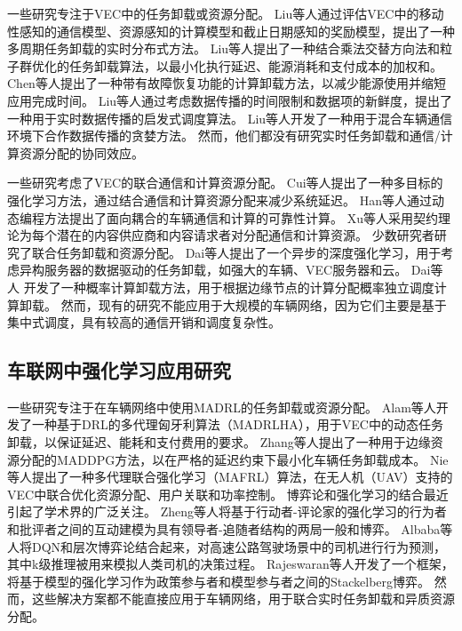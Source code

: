 一些研究专注于VEC中的任务卸载或资源分配。
Liu等人\cite{liu2021rtds}通过评估VEC中的移动性感知的通信模型、资源感知的计算模型和截止日期感知的奖励模型，提出了一种多周期任务卸载的实时分布式方法。
Liu等人\cite{liu2022a}提出了一种结合乘法交替方向法和粒子群优化的任务卸载算法，以最小化执行延迟、能源消耗和支付成本的加权和。
Chen等人\cite{chen2020robust}提出了一种带有故障恢复功能的计算卸载方法，以减少能源使用并缩短应用完成时间。
Liu等人\cite{liu2014temporal}通过考虑数据传播的时间限制和数据项的新鲜度，提出了一种用于实时数据传播的启发式调度算法。
Liu等人\cite{liu2016cooperative}开发了一种用于混合车辆通信环境下合作数据传播的贪婪方法。
然而，他们都没有研究实时任务卸载和通信/计算资源分配的协同效应。

一些研究考虑了VEC的联合通信和计算资源分配。
Cui等人\cite{cui2021reinforcement}提出了一种多目标的强化学习方法，通过结合通信和计算资源分配来减少系统延迟。
Han等人\cite{han2020reliability}通过动态编程方法提出了面向耦合的车辆通信和计算的可靠性计算。
Xu等人\cite{xu2021socially}采用契约理论为每个潜在的内容供应商和内容请求者对分配通信和计算资源。
少数研究者研究了联合任务卸载和资源分配。
Dai等人\cite{dai2021asynchronous}提出了一个异步的深度强化学习，用于考虑异构服务器的数据驱动的任务卸载，如强大的车辆、VEC服务器和云。
Dai等人 \cite{dai2022a}开发了一种概率计算卸载方法，用于根据边缘节点的计算分配概率独立调度计算卸载。
然而，现有的研究不能应用于大规模的车辆网络，因为它们主要是基于集中式调度，具有较高的通信开销和调度复杂性。

\subsection{车联网中强化学习应用研究}

一些研究专注于在车辆网络中使用MADRL的任务卸载或资源分配\cite{althamary2019a}。
Alam等人\cite{alam2022multi}开发了一种基于DRL的多代理匈牙利算法（MADRLHA），用于VEC中的动态任务卸载，以保证延迟、能耗和支付费用的要求。
Zhang等人\cite{zhang2021adaptive}提出了一种用于边缘资源分配的MADDPG方法，以在严格的延迟约束下最小化车辆任务卸载成本。
Nie等人\cite{nie2021semi}提出了一种多代理联合强化学习（MAFRL）算法，在无人机（UAV）支持的VEC中联合优化资源分配、用户关联和功率控制。
博弈论和强化学习的结合最近引起了学术界的广泛关注。
Zheng等人\cite{zheng2022stackelberg}将基于行动者-评论家的强化学习的行为者和批评者之间的互动建模为具有领导者-追随者结构的两局一般和博弈。
Albaba等人\cite{albaba2021driver}将DQN和层次博弈论结合起来，对高速公路驾驶场景中的司机进行行为预测，其中k级推理被用来模拟人类司机的决策过程。
Rajeswaran等人\cite{rajeswaran2020a}开发了一个框架，将基于模型的强化学习作为政策参与者和模型参与者之间的Stackelberg博弈。
然而，这些解决方案都不能直接应用于车辆网络，用于联合实时任务卸载和异质资源分配。

